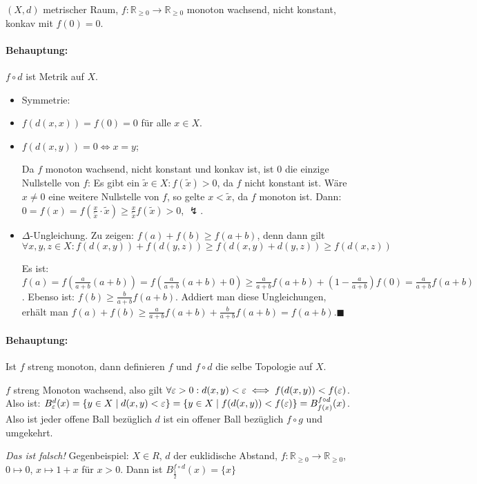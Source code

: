 \documentclass{article}
\begin{document}
$(X,d)$ metrischer Raum, $f:\mathbb R_{\ge0} \to \mathbb R_{\ge0}$ monoton wachsend, nicht konstant, konkav mit $f(0)=0$.

\paragraph{Behauptung:} $f\circ d$ ist Metrik auf $X$.

\begin{itemize}
\item Symmetrie: \checkmark
\item $f(d(x,x)) = f(0) = 0$ für alle $x\in X$.
\item $f(d(x,y)) = 0 \iff x=y$;

Da $f$ monoton wachsend, nicht konstant und konkav ist, ist $0$ die einzige Nullstelle von $f$: Es gibt ein $\tilde x \in X : f(\tilde x) > 0$, da $f$ nicht konstant ist. Wäre $x\ne 0$ eine weitere Nullstelle von $f$, so gelte $x<\tilde x$, da $f$ monoton ist. Dann: $0 = f(x) = f(\frac x {\tilde x}\cdot \tilde x)\ge \frac x {\tilde x} f(\tilde x) > 0$, $\lightning$.

\item $\Delta$-Ungleichung. Zu zeigen: $f(a) + f(b) \ge f(a + b)$, denn dann gilt $\forall x,y,z\in X: f(d(x,y)) + f(d(y,z)) \ge f(d(x,y) + d(y,z)) \ge f(d(x,z))$

Es ist: $f(a) = f(\frac a {a+b}(a+b)) = f(\frac a {a+b} (a+b) + 0 ) \ge \frac a{a+b} f(a+b) + (1- \frac a{a+b}) f(0) = \frac a{a+b} f(a+b)$. Ebenso ist: $f(b) \ge \frac b{a+b} f(a+b)$. Addiert man diese Ungleichungen, erhält man $f(a) + f(b) \ge \frac a{a+b}f(a+b) + \frac b{a+b}f(a+b) = f(a+b)$.\hfill$\blacksquare$
\end{itemize}

\paragraph{Behauptung:} Ist $f$ streng monoton, dann definieren $f$ und $f\circ d$ die selbe Topologie auf $X$.

$f$ streng Monoton wachsend, also gilt $\forall \varepsilon>0: d(x,y) <\varepsilon \iff f(d(x,y)) < f(\varepsilon)$. Also ist: $B_\varepsilon^d(x) = \{y\in X\mid d(x,y) <\varepsilon \} = \{y\in X\mid f(d(x,y))< f(\varepsilon)\} = B_{f(x)}^{f\circ d}(x)$. Also ist jeder offene Ball bezüglich $d$ ist ein offener Ball bezüglich $f\circ g$ und umgekehrt.

\emph{Das ist falsch!} Gegenbeispiel: $X\in R$, $d$ der euklidische Abstand, $f:\mathbb R_{\ge0} \to \mathbb R_{\ge0}$, $0 \mapsto 0$, $x\mapsto 1+x$ für $x>0$. Dann ist $B_{\frac 12}^{f\circ d}(x) = \{x\}$
\end{document}
